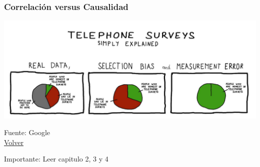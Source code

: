 \documentclass{beamer}
\begin{document}
\begin{frame} \label{hcinco}
\frametitle{Correlación versus Causalidad}
\begin{center}
    \includegraphics[scale=0.25]{Slides Principios de Economia/Figures/Introduccion_1.6_errormedicion.jpg}
\end{center}
Fuente: Google \\
\hyperlink{uno}{Volver} 
\end{frame}


\begin{frame}
\begin{center}
    \Huge Importante: Leer capitulo 2, 3 y 4
\end{center}
\end{frame}
\end{document}
